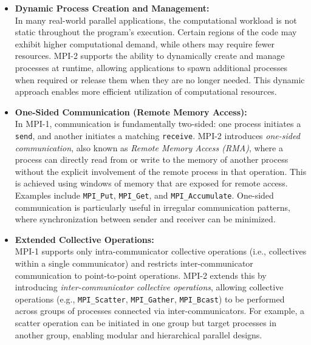\documentclass[12pt]{book}
\begin{document}
\begin{itemize}
    \item \textbf{Dynamic Process Creation and Management:} \\
    In many real-world parallel applications, the computational workload is not static throughout the program's execution. Certain regions of the code may exhibit higher computational demand, while others may require fewer resources. MPI-2 supports the ability to dynamically create and manage processes at runtime, allowing applications to spawn additional processes when required or release them when they are no longer needed. This dynamic approach enables more efficient utilization of computational resources.

    \item \textbf{One-Sided Communication (Remote Memory Access):} \\
    In MPI-1, communication is fundamentally two-sided: one process initiates a \texttt{send}, and another initiates a matching \texttt{receive}. MPI-2 introduces \emph{one-sided communication}, also known as \emph{Remote Memory Access (RMA)}, where a process can directly read from or write to the memory of another process without the explicit involvement of the remote process in that operation. This is achieved using windows of memory that are exposed for remote access. Examples include \texttt{MPI\_Put}, \texttt{MPI\_Get}, and \texttt{MPI\_Accumulate}. One-sided communication is particularly useful in irregular communication patterns, where synchronization between sender and receiver can be minimized.

    \item \textbf{Extended Collective Operations:} \\
    MPI-1 supports only intra-communicator collective operations (i.e., collectives within a single communicator) and restricts inter-communicator communication to point-to-point operations. MPI-2 extends this by introducing \emph{inter-communicator collective operations}, allowing collective operations (e.g., \texttt{MPI\_Scatter}, \texttt{MPI\_Gather}, \texttt{MPI\_Bcast}) to be performed across groups of processes connected via inter-communicators. For example, a scatter operation can be initiated in one group but target processes in another group, enabling modular and hierarchical parallel designs.


\end{itemize}
\end{document}
